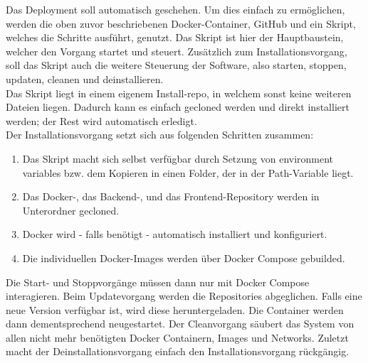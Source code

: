 	Das Deployment soll automatisch geschehen. Um dies einfach zu ermöglichen, werden die oben zuvor beschriebenen Docker-Container, GitHub und ein Skript, welches die Schritte ausführt, genutzt. Das Skript ist hier der Hauptbaustein, welcher den Vorgang startet und steuert. Zusätzlich zum Installationsvorgang, soll das Skript auch die weitere Steuerung der Software, also starten, stoppen, updaten, cleanen und deinstallieren.~\\
	Das Skript liegt in einem eigenem Install-\Gls{repo}, in welchem sonst keine weiteren Dateien liegen. Dadurch kann es einfach gecloned werden und direkt installiert werden; der Rest wird automatisch erledigt.~\\
	Der Installationsvorgang setzt sich aus folgenden Schritten zusammen:
	\begin{enumerate}
		\item Das Skript macht sich selbst verfügbar durch Setzung von environment variables bzw. dem Kopieren in einen Folder, der in der Path-Variable liegt.
		\item Das Docker-, das Backend-, und das Frontend-Repository werden in Unterordner gecloned.
		\item Docker wird - falls benötigt - automatisch installiert und konfiguriert.
		\item Die individuellen Docker-Images werden über Docker Compose gebuilded.
	\end{enumerate}
	Die Start- und Stoppvorgänge müssen dann nur mit Docker Compose interagieren. Beim Updatevorgang werden die Repositories abgeglichen. Falls eine neue Version verfügbar ist, wird diese heruntergeladen. Die Container werden dann dementsprechend neugestartet. Der Cleanvorgang säubert das System von allen nicht mehr benötigten Docker Containern, Images und Networks. Zuletzt macht der Deinstallationsvorgang einfach den Installationsvorgang rückgängig.
